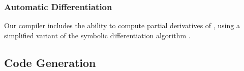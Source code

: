 


\subsubsection{Automatic Differentiation}
\label{sec:autodiff}
Our compiler includes the ability to compute partial derivatives of , using a simplified variant of the \DSTAR symbolic differentiation algorithm \cite{dstar}. 


\subsection{Code Generation} %
\label{sub:codegen}

